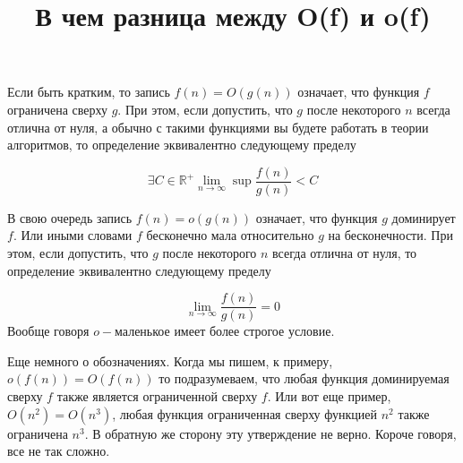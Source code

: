 \documentclass[11pt, oneside]{article}
\title{В чем разница между O(f) и o(f)}
\begin{document}
\maketitle

Если быть кратким, то запись $f(n) = O(g(n))$ означает, что функция $f$ ограничена сверху $g$.
При этом, если допустить, что $g$ после некоторого $n$ всегда отлична от нуля,
а обычно с такими функциями вы будете работать в теории алгоритмов,
то определение эквивалентно следующему пределу

\begin{equation*}
    \exists C \in \mathbb{R}^{+} \lim_{n \to \infty } \sup \frac{f(n)}{g(n)} < C
\end{equation*}

В свою очередь запись $f(n) = o(g(n))$ означает, что функция $g$ доминирует $f$.
Или иными словами $f$ бесконечно мала относительно $g$ на бесконечности.
При этом, если допустить, что $g$ после некоторого $n$ всегда отлична от нуля,
то определение эквивалентно следующему пределу

\begin{equation*}
    \lim_{n \to \infty } \frac{f(n)}{g(n)} = 0
\end{equation*}
Вообще говоря $o-$маленькое имеет более строгое условие.

Еще немного о обозначениях. Когда мы пишем, к примеру, $o(f(n)) = O(f(n))$ то подразумеваем,
что любая функция доминируемая сверху $f$ также является ограниченной сверху $f$.
Или вот еще пример,  $O(n^2) = O(n^3)$, любая функция ограниченная сверху функцией $n^2$
также ограничена $n^3$. В обратную же сторону эту утверждение не верно. Короче говоря, все не так сложно.
\end{document}
